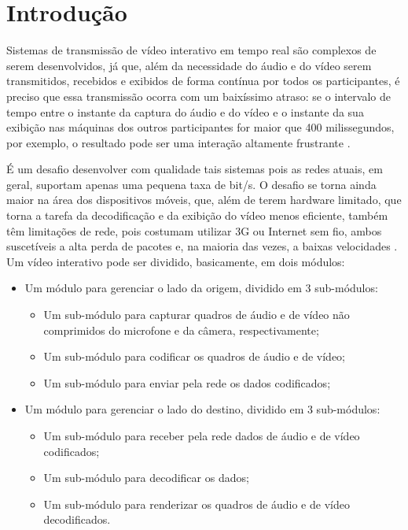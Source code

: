 \documentclass{acm_proc_article-sp}
\begin{document}

\section{Introdução}

Sistemas de transmissão de vídeo interativo em tempo real são complexos de serem desenvolvidos, já que, além da necessidade do áudio e do vídeo serem transmitidos, recebidos e exibidos de forma contínua por todos os participantes, é preciso que essa transmissão ocorra com um baixíssimo atraso: se o intervalo de tempo entre o instante da captura do áudio e do vídeo e o instante da sua exibição nas máquinas dos outros participantes for maior que 400 milissegundos, por exemplo, o resultado pode ser uma interação altamente frustrante \cite{kurose_2001}.

É um desafio desenvolver com qualidade tais sistemas pois as redes atuais, em geral, suportam apenas uma pequena taxa de bit/s. O desafio se torna ainda maior na área dos dispositivos móveis, que, além de terem hardware limitado, que torna a tarefa da decodificação e da exibição do vídeo menos eficiente, também têm limitações de rede, pois costumam utilizar 3G ou Internet sem fio, ambos suscetíveis a alta perda de pacotes e, na maioria das vezes, a baixas velocidades \cite{huynh-thu_2008}. Um vídeo interativo pode ser dividido, basicamente, em dois módulos:
\begin{itemize}
 \item Um módulo para gerenciar o lado da origem, dividido em 3 sub-módulos:
 \begin{itemize}
  \item Um sub-módulo para capturar quadros de áudio e de vídeo não comprimidos do microfone e da câmera, respectivamente;
  \item Um sub-módulo para codificar os quadros de áudio e de vídeo;
  \item Um sub-módulo para enviar pela rede os dados codificados;
 \end{itemize}
 \item Um módulo para gerenciar o lado do destino, dividido em 3 sub-módulos:
 \begin{itemize}
  \item Um sub-módulo para receber pela rede dados de áudio e de vídeo codificados;
  \item Um sub-módulo para decodificar os dados;
  \item Um sub-módulo para renderizar os quadros de áudio e de vídeo decodificados.
 \end{itemize}
\end{itemize}
\end{document}
